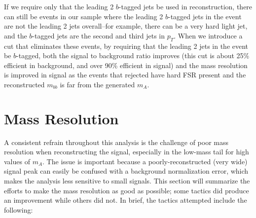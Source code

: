                                                                                                                                     
If we require only that the leading 2 $b$-tagged jets be used in reconstruction, there can                                          
still be events in our sample where the leading 2 $b$-tagged jets in the event are not                                              
the leading 2 jets overall--for example, there can be a very hard light jet, and the $b$-tagged                                     
jets are the second and third jets in $p_T$.  When we introduce a cut that eliminates these events,                                 
by requiring that the leading 2 jets in the event be $b$-tagged, both the signal to background                                      
ratio improves (this cut is about 25\% efficient in background, and over 90\% efficient                                             
in signal) and the mass resolution is improved in signal as the events that rejected have                                           
hard FSR present and the reconstructed $m_{bb}$ is far from the generated $m_A$.    




\section{Mass Resolution}
\label{sec:mass_res}


A consistent refrain throughout this analysis is the challenge of poor mass resolution when reconstructing
the signal, especially in the low-mass tail for high values of $m_A$. The 
issue is important because a poorly-reconstructed (very wide)
signal peak can easily be confused with a background normalization error, which makes the analysis less
sensitive to small signals. This section will summarize the efforts to make the mass resolution as good
as possible; some tactics did produce an improvement while others did not.  In brief, the tactics
attempted include the following:

